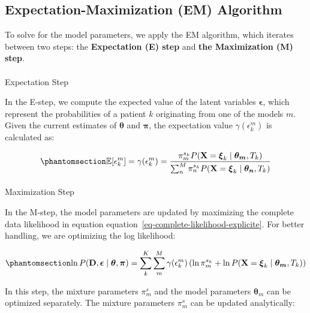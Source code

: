 \documentclass[
  sn-mathphys-num,
]{sn-jnl}
\makeatletter
\let\oldparagraph\paragraph
\renewcommand{\paragraph}{
    \@ifstar
      \xxxParagraphStar
      \xxxParagraphNoStar
  }
\newcommand{\xxxParagraphStar}[1]{\oldparagraph*{#1}\mbox{}}
\newcommand{\xxxParagraphNoStar}[1]{\oldparagraph{#1}\mbox{}}
\makeatother
\begin{document}
\subsection{Expectation-Maximization (EM)
Algorithm}\label{expectation-maximization-em-algorithm}

To solve for the model parameters, we apply the EM algorithm, which
iterates between two steps: the \textbf{Expectation (E) step} and
\textbf{the Maximization (M) step}.

\paragraph{Expectation Step}\label{expectation-step}

In the E-step, we compute the expected value of the latent variables
\(\boldsymbol{\epsilon}\), which represent the probabilities of a
patient \(k\) originating from one of the models \(m\). Given the
current estimates of \(\boldsymbol{\theta}\) and \(\boldsymbol{\pi}\),
the expectation value \(\gamma(\epsilon_k^m)\) is calculated as:

\begin{equation}\phantomsection\label{eq-expectation-step}{
\mathbb{E}[\epsilon^m_k] = \gamma(\epsilon^m_{k}) = \frac{\pi_m^{s_k} P(\mathbf{X} = \boldsymbol{\xi}_k \mid \boldsymbol{\theta_m}, T_k)}{\sum_{n}^M \pi_n^{s_k} P(\mathbf{X} = \boldsymbol{\xi}_k \mid \boldsymbol{\theta_n}, T_k)}
}\end{equation}

\paragraph{Maximization Step}\label{maximization-step}

In the M-step, the model parameters are updated by maximizing the
complete data likelihood in equation
equation~\ref{eq-complete-likelihood-explicite}. For better handling, we
are optimizing the log likelihood:

\begin{equation}\phantomsection\label{eq-maximization-step}{
\ln P(\mathbf{D}, \boldsymbol{\epsilon} \mid \boldsymbol{\theta}, \boldsymbol{\pi}) = \sum_k^K \sum_{m}^M \gamma(\epsilon^m_{k}) \left( \ln \pi_m^{s_k} + \ln P(\mathbf{X} = \boldsymbol{\xi}_k \mid \boldsymbol{\theta_m}, T_k) \right)
}\end{equation}

In this step, the mixture parameters \(\pi_m^s\) and the model
parameters \(\boldsymbol{\theta}_m\) can be optimized separately. The
mixture parameters \(\pi_m^s\) can be updated analytically:
\end{document}
